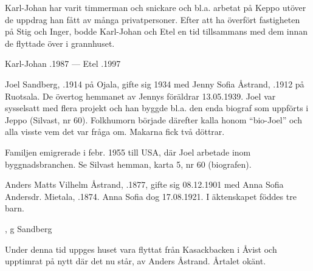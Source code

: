 Karl-Johan har varit timmerman och snickare och bl.a. arbetat på Keppo utöver de uppdrag han fått av många privatpersoner. Efter att ha överfört fastigheten på Stig och Inger, bodde Karl-Johan och Etel en tid tillsammans med dem innan de flyttade över i grannhuset.
\begin{jhchildren}
  \item {}
  \item {}
  \item {}
  \item {}
  \item {}
\end{jhchildren}

Karl-Johan .1987  ---  Etel .1997


%
Joel Sandberg, .1914 på Ojala, gifte sig 1934 med Jenny Sofia Åstrand, .1912 på Ruotsala. De övertog hemmanet av Jennys föräldrar 13.05.1939. Joel var sysselsatt med flera projekt och han byggde bl.a. den enda biograf som uppförts i Jeppo (Silvast, nr 60). Folkhumorn började därefter kalla honom ``bio-Joel'' och alla visste vem det var fråga om. Makarna fick två döttrar.
\begin{jhchildren}
  \item {}
  \item {}
\end{jhchildren}

Familjen emigrerade i febr. 1955 till USA, där Joel arbetade inom byggnadsbranchen. Se Silvast hemman, karta 5, nr 60 (biografen).


%
Anders Matts Vilhelm Åstrand, .1877, gifte sig 08.12.1901 med Anna Sofia Andersdr. Mietala, .1874. Anna Sofia dog 17.08.1921. I äktenskapet föddes tre barn.
\begin{jhchildren}
  \item {}
  \item {}
  \item {}, g Sandberg
\end{jhchildren}
Under denna tid uppges huset vara flyttat från Kasackbacken i Åvist och upptimrat på nytt där det nu står, av Anders Åstrand. Årtalet okänt.


